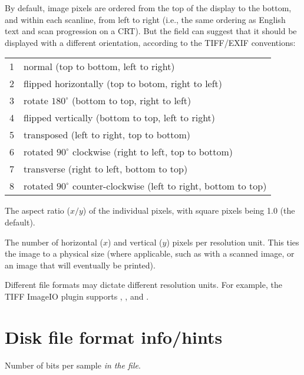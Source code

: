 \label{metadata:orientation}

By default, image pixels are ordered from the top of the display to the
bottom, and within each scanline, from left to right (i.e., the same
ordering as English text and scan progression on a CRT).  But the
 field can suggest that it should be displayed with
a different orientation, according to the TIFF/EXIF conventions:

\begin{tabular}{p{0.3in} p{4in}}
1 & normal (top to bottom, left to right)  \\
2 & flipped horizontally (top to botom, right to left)  \\
3 & rotate $180^\circ$ (bottom to top, right to left) \\
4 & flipped vertically (bottom to top, left to right)  \\
5 & transposed (left to right, top to bottom) \\
6 & rotated $90^\circ$ clockwise (right to left, top to bottom) \\
7 & transverse (right to left, bottom to top) \\
8 & rotated $90^\circ$ counter-clockwise (left to right, bottom to top) \\
\end{tabular}
\apiend

The aspect ratio ($x/y$) of the individual pixels, with square pixels
being 1.0 (the default).
\apiend

The number of horizontal ($x$) and vertical ($y$) pixels per 
resolution unit.  This ties the image to a physical size (where 
applicable, such as with a scanned image, or an image that will
eventually be printed).

Different file formats may dictate different resolution units.
For example, the TIFF ImageIO plugin supports , , 
and .
\apiend

\section{Disk file format info/hints}

Number of bits per sample \emph{in the file}.  


